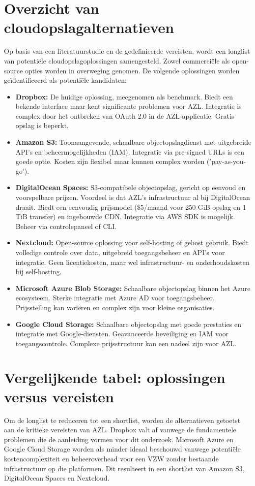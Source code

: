 \section{Overzicht van cloudopslagalternatieven}
\label{sec:overzicht_alternatieven}
Op basis van een literatuurstudie en de gedefinieerde vereisten, wordt een longlist van potentiële cloudopslagoplossingen samengesteld.
Zowel commerciële als open-source opties worden in overweging genomen. De volgende oplossingen worden geïdentificeerd als potentiële kandidaten:
\begin{itemize}
    \item \textbf{Dropbox:} De huidige oplossing, meegenomen als benchmark. Biedt een bekende interface maar kent significante problemen voor AZL. Integratie is complex door het ontbreken van OAuth 2.0 in de AZL-applicatie. Gratis opslag is beperkt.
    \item \textbf{Amazon S3:} Toonaangevende, schaalbare objectopslagdienst met uitgebreide API's en beheermogelijkheden (IAM). Integratie via pre-signed URLs is een goede optie. Kosten zijn flexibel maar kunnen complex worden ('pay-as-you-go').
    \item \textbf{DigitalOcean Spaces:} S3-compatibele objectopslag, gericht op eenvoud en voorspelbare prijzen. Voordeel is dat AZL's infrastructuur al bij DigitalOcean draait. Biedt een eenvoudig prijsmodel (\$5/maand voor 250 GiB opslag en 1 TiB transfer) en ingebouwde CDN. Integratie via AWS SDK is mogelijk. Beheer via controlepaneel of CLI.
    \item \textbf{Nextcloud:} Open-source oplossing voor self-hosting of gehost gebruik. Biedt volledige controle over data, uitgebreid toegangsbeheer en API's voor integratie. Geen licentiekosten, maar wel infrastructuur- en onderhoudskosten bij self-hosting.
    \item \textbf{Microsoft Azure Blob Storage:} Schaalbare objectopslag binnen het Azure ecosysteem. Sterke integratie met Azure AD voor toegangsbeheer. Prijsstelling kan variëren en complex zijn voor kleine organisaties.
    \item \textbf{Google Cloud Storage:} Schaalbare objectopslag met goede prestaties en integratie met Google-diensten. Geavanceerde beveiliging en IAM voor toegangscontrole. Complexe prijsstructuur kan een nadeel zijn voor AZL.
\end{itemize}

\section{Vergelijkende tabel: oplossingen versus vereisten}
\label{sec:vergelijkingstabel}
Om de longlist te reduceren tot een shortlist, worden de alternatieven getoetst aan de kritieke vereisten van AZL. Dropbox valt af vanwege de fundamentele problemen die de aanleiding vormen voor dit onderzoek. Microsoft Azure en Google Cloud Storage worden als minder ideaal beschouwd vanwege potentiële kostencomplexiteit en beheeroverhead voor een VZW zonder bestaande infrastructuur op die platformen. Dit resulteert in een shortlist van Amazon S3, DigitalOcean Spaces en Nextcloud.

